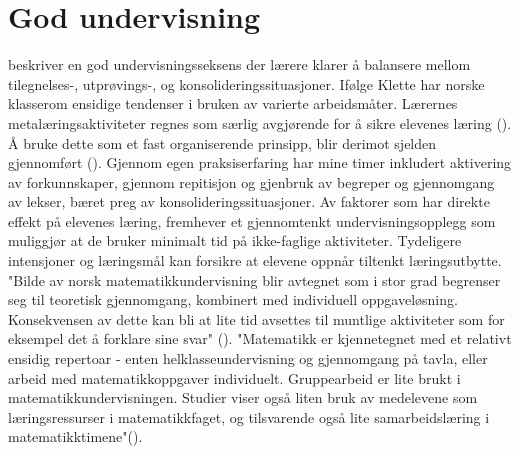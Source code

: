 \documentclass[12pt,twoside,onecolumn,norsk]{article}
\begin{document}
\section*{God undervisning}
 beskriver en god undervisningsseksens der lærere klarer å balansere mellom 
tilegnelses-, utprøvings-, og konsolideringssituasjoner. Ifølge Klette har norske klasserom ensidige 
tendenser i bruken av varierte arbeidsmåter. Lærernes metalæringsaktiviteter regnes som særlig 
avgjørende for å sikre elevenes læring (). Å bruke dette som et fast
organiserende prinsipp, blir derimot sjelden gjennomført (). Gjennom egen 
praksiserfaring har mine timer inkludert aktivering av forkunnskaper, gjennom repitisjon og 
gjenbruk av begreper og gjennomgang av lekser, bæret preg av konsolideringssituasjoner.
\newline
\newline
Av faktorer som har direkte effekt på elevenes 
læring, fremhever  et gjennomtenkt undervisningsopplegg som muliggjør at 
de bruker minimalt tid på ikke-faglige aktiviteter. Tydeligere intensjoner og læringsmål
kan forsikre at elevene oppnår tiltenkt læringsutbytte. 
\newline
\newline
"Bilde av norsk matematikkundervisning blir avtegnet som i stor grad begrenser seg til 
teoretisk gjennomgang, kombinert med individuell oppgaveløsning. Konsekvensen av dette
kan bli at lite tid avsettes til muntlige aktiviteter som for eksempel det å forklare
sine svar" (). "Matematikk er kjennetegnet med et relativt
ensidig repertoar - enten helklasseundervisning og gjennomgang på tavla, eller arbeid
med matematikkoppgaver individuelt. Gruppearbeid er lite brukt i matematikkundervisningen.
Studier viser også liten bruk av medelevene som læringsressurser i matematikkfaget, og
tilsvarende også lite samarbeidslæring i matematikktimene"().
\end{document}
